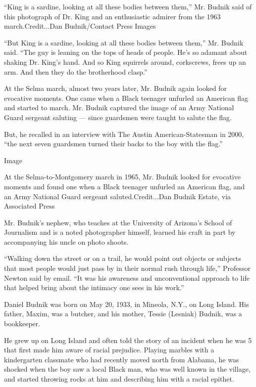 ``King is a sardine, looking at all these bodies between them,'' Mr.
Budnik said of this photograph of Dr. King and an enthusiastic admirer
from the 1963 march.Credit...Dan Budnik/Contact Press Images

``But King is a sardine, looking at all these bodies between them,'' Mr.
Budnik said. ``The guy is leaning on the tops of heads of people. He's
so adamant about shaking Dr. King's hand. And so King squirrels around,
corkscrews, frees up an arm. And then they do the brotherhood clasp.''

At the Selma march, almost two years later, Mr. Budnik again looked for
evocative moments. One came when a Black teenager unfurled an American
flag and started to march. Mr. Budnik captured the image of an Army
National Guard sergeant saluting --- since guardsmen were taught to
salute the flag.

But, he recalled in an interview with The Austin American-Statesman in
2000, ``the next seven guardsmen turned their backs to the boy with the
flag.''

Image

At the Selma-to-Montgomery march in 1965, Mr. Budnik looked for
evocative moments and found one when a Black teenager unfurled an
American flag, and an Army National Guard sergeant saluted.Credit...Dan
Budnik Estate, via Associated Press

Mr. Budnik's nephew, who teaches at the University of Arizona's School
of Journalism and is a noted photographer himself, learned his craft in
part by accompanying his uncle on photo shoots.

``Walking down the street or on a trail, he would point out objects or
subjects that most people would just pass by in their normal rush
through life,'' Professor Newton said by email. ``It was his awareness
and unconventional approach to life that helped bring about the intimacy
one sees in his work.''

Daniel Budnik was born on May 20, 1933, in Mineola, N.Y., on Long
Island. His father, Maxim, was a butcher, and his mother, Tessie
(Lesniak) Budnik, was a bookkeeper.

He grew up on Long Island and often told the story of an incident when
he was 5 that first made him aware of racial prejudice. Playing marbles
with a kindergarten classmate who had recently moved north from Alabama,
he was shocked when the boy saw a local Black man, who was well known in
the village, and started throwing rocks at him and describing him with a
racial epithet.

